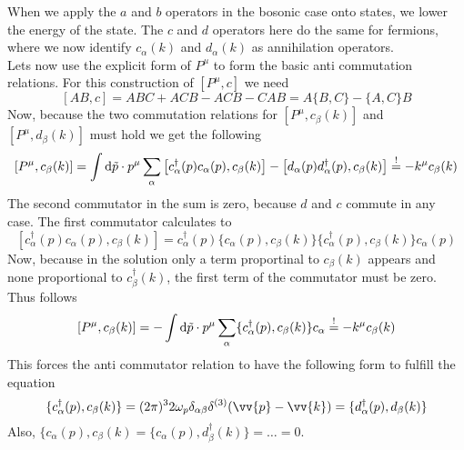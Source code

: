 \documentclass{include/thesisclass}
\newcommand{\cc}{\cdot}
\newcommand{\vp}{\vv{p}}
\newcommand{\dd}{{\rm d}}
\newcommand{\soll}{\overset{!}{=}}
\begin{document}
When we apply the $a$ and $b$ operators in the bosonic case onto states, we lower the energy of the state. The $c$ and $d$ operators here do the same for fermions, where we now identify $c_\alpha(k)$ and $d_\alpha(k)$ as annihilation operators.\\
Lets now use the explicit form of $P^\mu $ to form the basic anti commutation relations. 
For this construction of $[P^\mu, c]$ we need
\[ [AB,c] = ABC + ACB - ACB - CAB = A\{B,C\} - \{A,C\}B\]
Now, because the two commutation relations for $[P^\mu, c_\beta(k)]$ and $[P^\mu, d_\beta(k)]$ must hold we get the following
\[ [P^\mu , c_{\beta}(k)] = \int \dd \tilde p \cc p^\mu \sum_\alpha \left[ c_\alpha^\dagger(p)c_\alpha(p), c_\beta(k)\right] - \left[ d_\alpha(p)d_\alpha^\dagger(p), c_\beta(k)\right] \soll -k^\mu c_\beta(k)\]
The second commutator in the sum is zero, because $d$ and $c$ commute in any case. 
The first commutator calculates to 
\[ \left[ c_\alpha^\dagger(p) c_\alpha(p), c_\beta(k)\right] = c_\alpha^\dagger(p) \{c_\alpha(p), c_\beta(k)\}  \{c_\alpha^\dagger(p), c_\beta(k)\} c_\alpha(p)\]
Now, because in the solution only a term proportinal to $c_\beta(k)$ appears and none proportional to $c^\dagger_\beta(k)$, the first term of the commutator must be zero.
Thus follows
\[ [P^\mu, c_\beta(k)] = - \int \dd \tilde p \cc p^\mu \sum_\alpha \{c_\alpha^\dagger(p), c_\beta(k)\} c_\alpha \soll -k^\mu c_\beta(k)\]
This forces the anti commutator relation to have the following form to fulfill the equation
\[ \{c_\alpha^\dagger(p), c_\beta(k)\} = (2\pi)^3 2 \omega_p \delta_{\alpha\beta} \delta^{(3)}(\vp - \vv{k}) = \{d_\alpha^\dagger(p), d_\beta(k)\}\]
Also, $\{c_\alpha(p), c_\beta(k) = \{c_\alpha(p), d_\beta^\dagger(k)\} = \ldots = 0$.
\end{document}
